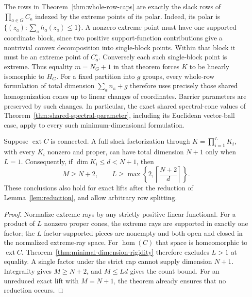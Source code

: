 The rows in Theorem~\ref{thm:whole-row-caps} are exactly the slack rows
of $\prod_{a\in G}C_a$ indexed by the extreme points of its polar.
Indeed, its polar is
$\{(z_a):\sum_a h_a(z_a)\leq1\}$. A nonzero extreme point must have
one supported coordinate block, since two positive support-function
contributions give a nontrivial convex decomposition into single-block
points. Within that block it must be an extreme point of $C_a^\circ$.
Conversely each such single-block point is extreme. Thus equality
$m=N_G+1$ in that theorem forces $K$ to be linearly isomorphic to $H_G$.
For a fixed partition into $g$ groups, every whole-row formulation of
total dimension $\sum_a n_a+g$ therefore uses precisely those shared
homogenization cones up to linear changes of coordinates. Barrier
parameters are preserved by such changes. In particular, the exact
shared spectral-cone values of
Theorem~\ref{thm:shared-spectral-parameter}, including its Euclidean
vector-ball case, apply to every such minimum-dimensional formulation.

\begin{corollary}
\label{cor:connected-extreme-gap}
Suppose $\operatorname{ext}C$ is connected. A full slack factorization
through $K=\prod_{i=1}^L K_i$, with every $K_i$ nonzero and proper,
can have total dimension $N+1$ only when $L=1$. Consequently, if
$\dim K_i\leq d<N+1$, then
\begin{equation}\label{eq:connected-extreme-gap}
 M\geq N+2,\qquad
 L\geq\max\left\{2,\left\lceil\frac{N+2}{d}\right\rceil\right\}.
\end{equation}
These conclusions also hold for exact lifts after the reduction of
Lemma~\ref{lem:reduction}, and allow arbitrary row splitting.
\end{corollary}
\begin{proof}
Normalize extreme rays by any strictly positive linear functional.
For a product of $L$ nonzero proper cones, the extreme rays are supported
in exactly one factor; the $L$ factor-supported pieces are nonempty
and both open and closed in the normalized extreme-ray space. For
$\operatorname{hom}(C)$ that space is homeomorphic to
$\operatorname{ext}C$. Theorem~\ref{thm:minimal-dimension-rigidity}
therefore excludes $L>1$ at equality. A single factor under the strict
cap cannot supply dimension $N+1$. Integrality gives $M\geq N+2$,
and $M\leq Ld$ gives the count bound. For an unreduced exact lift
with $M=N+1$, the theorem already ensures that no reduction occurs.
\end{proof}

